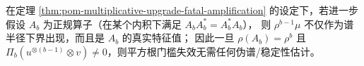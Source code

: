 \begin{corollary}[正规升级的直接谱点推出]\label{cor:pom-multiplicative-upgrade-normal-direct-spectrum}
在定理 \ref{thm:pom-multiplicative-upgrade-fatal-amplification} 的设定下，若进一步假设 \(A_b\) 为正规算子（在某个内积下满足 \(A_bA_b^\ast=A_b^\ast A_b\)），
则 \(\rho^{b-1}\mu\) 不仅作为谱半径下界出现，而且是 \(A_b\) 的真实特征值；
因此一旦 \(\rho(A_b)=\rho^b\) 且 \(\Pi_b(u^{\otimes(b-1)}\otimes v)\neq 0\)，则平方根门槛失效无需任何伪谱/稳定性估计。
\end{corollary}


